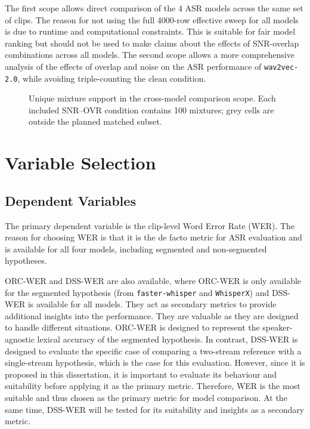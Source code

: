 The first scope allows direct comparison of the 4 ASR models across the same set of clips. The reason for not using the full 4000-row effective sweep for all models is due to runtime and computational constraints. This is suitable for fair model ranking but should not be used to make claims about the effects of SNR-overlap combinations across all models. The second scope allows a more comprehensive analysis of the effects of overlap and noise on the ASR performance of \texttt{wav2vec-2.0}, while avoiding triple-counting the clean condition.

\begin{figure}[htbp]
    \centering
    \caption{Unique mixture support in the cross-model comparison scope. Each included SNR--OVR condition contains 100 mixtures; grey cells are outside the planned matched subset.}
    \label{fig:stat_cross_model_scope_support}
\end{figure}

\section{Variable Selection}
\subsection{Dependent Variables}
The primary dependent variable is the clip-level Word Error Rate (WER). The reason for choosing WER is that it is the de facto metric for ASR evaluation \cite{sasindran2023hevalnewhybridevaluation} and is available for all four models, including segmented and non-segmented hypotheses.

ORC-WER and DSS-WER are also available, where ORC-WER is only available for the segmented hypothesis (from \texttt{faster-whisper} and \texttt{WhisperX}) and DSS-WER is available for all models. They act as secondary metrics to provide additional insights into the performance. They are valuable as they are designed to handle different situations. ORC-WER is designed to represent the speaker-agnostic lexical accuracy of the segmented hypothesis. In contrast, DSS-WER is designed to evaluate the specific case of comparing a two-stream reference with a single-stream hypothesis, which is the case for this evaluation. However, since it is proposed in this dissertation, it is important to evaluate its behaviour and suitability before applying it as the primary metric. Therefore, WER is the most suitable and thus chosen as the primary metric for model comparison. At the same time, DSS-WER will be tested for its suitability and insights as a secondary metric.

